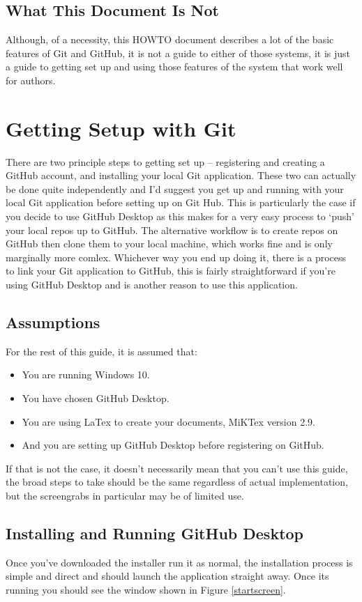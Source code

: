 \documentclass[a4paper, 12pt]{article}
\begin{document}
\subsection{What This Document Is Not}
Although, of a necessity, this HOWTO document describes a lot of the basic features of Git and GitHub, it is not a guide to either of those systems, it is just a guide to getting set up and using those features of the system that work well for authors.

\section{Getting Setup with Git}
There are two principle steps to getting set up -- registering and creating a GitHub account, and installing your local Git application. These two can actually be done quite independently and I'd suggest you get up and running with your local Git application before setting up on Git Hub. This is particularly the case if you decide to use GitHub Desktop as this makes for a very easy process to `push' your local repos up to GitHub. The alternative workflow is to create repos on GitHub then clone them to your local machine, which works fine and is only marginally more comlex. Whichever way you end up doing it, there is a process to link your Git application to GitHub, this is fairly straightforward if you're using GitHub Desktop and is another reason to use this application.

\subsection{Assumptions}
For the rest of this guide, it is assumed that:
\begin{itemize}
\item You are running Windows 10.
\item You have chosen GitHub Desktop.
\item You are using LaTex to create your documents, MiKTex version 2.9.
\item And you are setting up GitHub Desktop before registering on GitHub.
\end{itemize}
If that is not the case, it doesn't necessarily mean that you can't use this guide, the broad steps to take should be the same regardless of actual implementation, but the screengrabs in particular may be of limited use.

\subsection{Installing and Running GitHub Desktop}
Once you've downloaded the installer run it as normal, the installation process is simple and direct and should launch the application straight away. Once its running you should see the window shown in Figure \ref{startscreen}.
\end{document}
